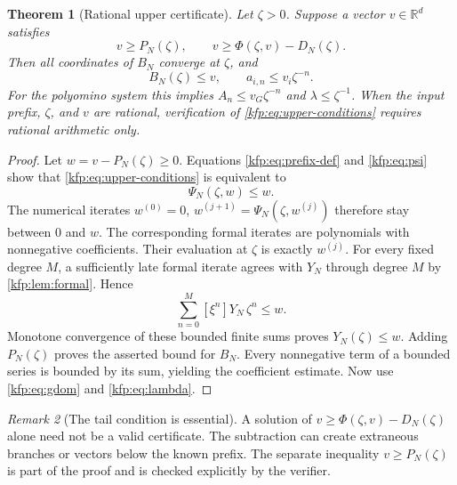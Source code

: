 \documentclass[11pt,a4paper]{article}
\newtheorem{theorem}{Theorem}[section]
\theoremstyle{definition}
\theoremstyle{remark}
\newtheorem{remark}[theorem]{Remark}
\newcommand{\R}{\mathbb R}
\begin{document}
\begin{theorem}[Rational upper certificate]\label{kfp:thm:upper}
Let $\zeta>0$. Suppose a vector $v\in\R^d$ satisfies
\begin{equation}\label{kfp:eq:upper-conditions}
 v\geq P_N(\zeta),\qquad
 v\geq\Phi(\zeta,v)-D_N(\zeta).
\end{equation}
Then all coordinates of $B_N$ converge at $\zeta$, and
\[
 B_N(\zeta)\leq v,\qquad
 a_{i,n}\leq v_i\zeta^{-n}.
\]
For the polyomino system this implies
$A_n\leq v_G\zeta^{-n}$ and $\lambda\leq\zeta^{-1}$.
When the input prefix, $\zeta$, and $v$ are rational, verification of
\eqref{kfp:eq:upper-conditions} requires rational arithmetic only.
\end{theorem}
\begin{proof}
Let $w=v-P_N(\zeta)\geq0$. Equations \eqref{kfp:eq:prefix-def} and
\eqref{kfp:eq:psi} show that \eqref{kfp:eq:upper-conditions} is equivalent to
\[
 \Psi_N(\zeta,w)\leq w.
\]
The numerical iterates $w^{(0)}=0$,
$w^{(j+1)}=\Psi_N(\zeta,w^{(j)})$ therefore stay between $0$ and $w$.
The corresponding formal iterates are polynomials with nonnegative
coefficients. Their evaluation at $\zeta$ is exactly $w^{(j)}$.
For every fixed degree $M$, a sufficiently late formal iterate agrees with
$Y_N$ through degree $M$ by \cref{kfp:lem:formal}. Hence
\[
 \sum_{n=0}^M[\xi^n]Y_N\,\zeta^n\leq w.
\]
Monotone convergence of these bounded finite sums proves
$Y_N(\zeta)\leq w$. Adding $P_N(\zeta)$ proves the asserted bound for $B_N$.
Every nonnegative term of a bounded series is bounded by its sum, yielding
the coefficient estimate. Now use \eqref{kfp:eq:gdom} and \eqref{kfp:eq:lambda}.
\end{proof}

\begin{remark}[The tail condition is essential]
A solution of $v\geq\Phi(\zeta,v)-D_N(\zeta)$ alone need not be a valid
certificate. The subtraction can create extraneous branches or vectors below
the known prefix. The separate inequality $v\geq P_N(\zeta)$ is part of the
proof and is checked explicitly by the verifier.
\end{remark}
\end{document}
